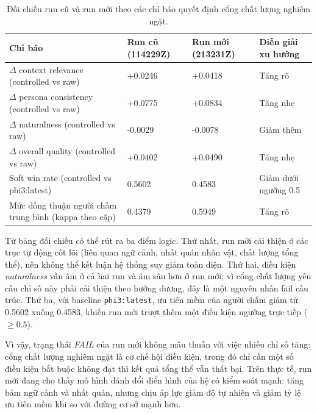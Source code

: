 ﻿\documentclass[a4paper,12pt]{article}
\begin{document}
\begin{table}[t]
\centering
\caption{Đối chiếu run cũ và run mới theo các chỉ báo quyết định cổng chất lượng nghiêm ngặt.}
\label{tab:old_new_run_comparison}
\begingroup
\footnotesize
\setlength{\tabcolsep}{4pt}
\begin{tabular}{p{}p{}p{}p{}}
\toprule
Chỉ báo & Run cũ (114229Z) & Run mới (213231Z) & Diễn giải xu hướng \\
\midrule
\(\Delta\) context relevance (controlled vs raw) & +0.0246 & +0.0418 & Tăng rõ \\
\(\Delta\) persona consistency (controlled vs raw) & +0.0775 & +0.0834 & Tăng nhẹ \\
\(\Delta\) naturalness (controlled vs raw) & -0.0029 & -0.0078 & Giảm thêm \\
\(\Delta\) overall quality (controlled vs raw) & +0.0402 & +0.0490 & Tăng nhẹ \\
Soft win rate (controlled vs phi3:latest) & 0.5602 & 0.4583 & Giảm dưới ngưỡng 0.5 \\
Mức đồng thuận người chấm trung bình (kappa theo cặp) & 0.4379 & 0.5949 & Tăng rõ \\
\bottomrule
\end{tabular}
\endgroup
\end{table}

Từ bảng đối chiếu có thể rút ra ba điểm logic. Thứ nhất, run mới cải thiện ở các trục tự động cốt lõi (liên quan ngữ cảnh, nhất quán nhân vật, chất lượng tổng thể), nên không thể kết luận hệ thống suy giảm toàn diện. Thứ hai, điều kiện \emph{naturalness} vẫn âm ở cả hai run và âm sâu hơn ở run mới; vì cổng chất lượng yêu cầu chỉ số này phải cải thiện theo hướng dương, đây là một nguyên nhân fail cấu trúc. Thứ ba, với baseline \texttt{phi3:latest}, ưu tiên mềm của người chấm giảm từ 0.5602 xuống 0.4583, khiến run mới trượt thêm một điều kiện ngưỡng trực tiếp (\(\ge 0.5\)).

Vì vậy, trạng thái \emph{FAIL} của run mới không mâu thuẫn với việc nhiều chỉ số tăng: cổng chất lượng nghiêm ngặt là cơ chế hội điều kiện, trong đó chỉ cần một số điều kiện bắt buộc không đạt thì kết quả tổng thể vẫn thất bại. Trên thực tế, run mới đang cho thấy mô hình đánh đổi điển hình của hệ có kiểm soát mạnh: tăng bám ngữ cảnh và nhất quán, nhưng chịu áp lực giảm độ tự nhiên và giảm tỷ lệ ưu tiên mềm khi so với đường cơ sở mạnh hơn.
\end{document}
